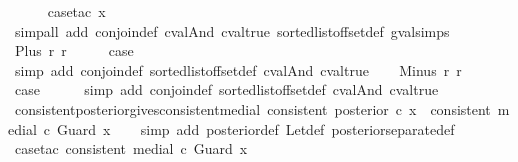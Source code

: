 \begin{isabellebody}
\ \ \ \ \isamarkupfalse%
\ {\isacharparenleft}case{\isacharunderscore}tac\ x{\isacharparenright}\isanewline
\ \ \ \ \isamarkupfalse%
\ {\isacharparenleft}simp{\isacharunderscore}all\ add{\isacharcolon}\ conjoin{\isacharunderscore}def\ cval{\isacharunderscore}And\ cval{\isacharunderscore}true\ sorted{\isacharunderscore}list{\isacharunderscore}of{\isacharunderscore}fset{\isacharunderscore}def\ gval{\isachardot}simps{\isacharparenright}\isanewline
{}\isamarkupfalse%
\isanewline
\ \ \isamarkupfalse%
\ {\isacharparenleft}Plus\ r{}\ r{}{\isacharparenright}\isanewline
\ \ \isamarkupfalse%
\ \isamarkupfalse%
\ {\isacharquery}case\isanewline
\ \ \ \ \isamarkupfalse%
\ {\isacharparenleft}simp\ add{\isacharcolon}\ conjoin{\isacharunderscore}def\ sorted{\isacharunderscore}list{\isacharunderscore}of{\isacharunderscore}fset{\isacharunderscore}def\ cval{\isacharunderscore}And\ cval{\isacharunderscore}true{\isacharparenright}\isanewline
{}\isamarkupfalse%
\isanewline
\ \ \isamarkupfalse%
\ {\isacharparenleft}Minus\ r{}\ r{}{\isacharparenright}\isanewline
\ \ \isamarkupfalse%
\ \isamarkupfalse%
\ {\isacharquery}case\isanewline
\ \ \ \ \isamarkupfalse%
\ {\isacharparenleft}simp\ add{\isacharcolon}\ conjoin{\isacharunderscore}def\ sorted{\isacharunderscore}list{\isacharunderscore}of{\isacharunderscore}fset{\isacharunderscore}def\ cval{\isacharunderscore}And\ cval{\isacharunderscore}true{\isacharparenright}\isanewline
{}\isamarkupfalse%
%
\endisatagproof
{\isafoldproof}%
%
\isadelimproof
\isanewline
%
\endisadelimproof
\isanewline
{}\isamarkupfalse%
\ consistent{\isacharunderscore}posterior{\isacharunderscore}gives{\isacharunderscore}consistent{\isacharunderscore}medial{\isacharcolon}\ {\isachardoublequoteopen}consistent\ {\isacharparenleft}posterior\ c\ x{\isacharparenright}\ {\isasymLongrightarrow}\ consistent\ {\isacharparenleft}medial\ c\ {\isacharparenleft}Guard\ x{\isacharparenright}{\isacharparenright}{\isachardoublequoteclose}\isanewline
%
\isadelimproof
\ \ %
\endisadelimproof
%
\isatagproof
{}\isamarkupfalse%
\ {\isacharparenleft}simp\ add{\isacharcolon}\ posterior{\isacharunderscore}def\ Let{\isacharunderscore}def\ posterior{\isacharunderscore}separate{\isacharunderscore}def{\isacharparenright}\isanewline
\ \ \isamarkupfalse%
\ {\isacharparenleft}case{\isacharunderscore}tac\ {\isachardoublequoteopen}consistent\ {\isacharparenleft}medial\ c\ {\isacharparenleft}Guard\ x{\isacharparenright}{\isacharparenright}{\isachardoublequoteclose}{\isacharparenright}\isanewline

\end{isabellebody}
